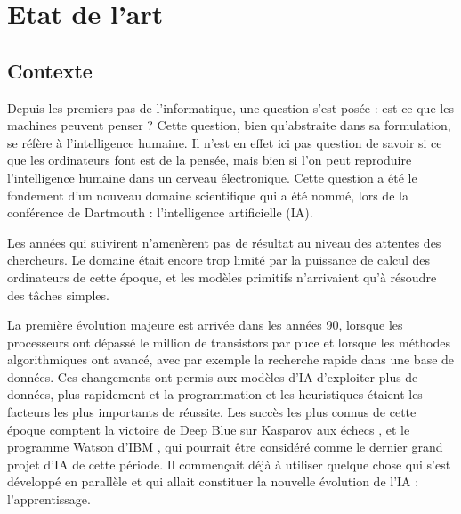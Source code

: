 \chapter{Etat de l'art}
	\minitoc
	\newpage






\section{Contexte}

	Depuis les premiers pas de l'informatique, une question s'est posée : est-ce que les machines peuvent penser ? \cite{turing1950computing} Cette question, bien qu'abstraite dans sa formulation, se réfère à l'intelligence humaine. Il n'est en effet ici pas question de savoir si ce que les ordinateurs font est de la pensée, mais bien si l'on peut reproduire l'intelligence humaine dans un cerveau électronique. Cette question a été le fondement d'un nouveau domaine scientifique qui a été nommé, lors de la conférence de Dartmouth \cite{mccarthy1955proposal} : l'intelligence artificielle (IA).

	Les années qui suivirent n'amenèrent pas de résultat au niveau des attentes des chercheurs. Le domaine était encore trop limité par la puissance de calcul des ordinateurs de cette époque, et les modèles primitifs n'arrivaient qu'à résoudre des tâches simples.

	La première évolution majeure est arrivée dans les années 90, lorsque les processeurs ont dépassé le million de transistors par puce et lorsque les méthodes algorithmiques ont avancé, avec par exemple la recherche rapide dans une base de données. Ces changements ont permis aux modèles d'IA d'exploiter plus de données, plus rapidement et la programmation et les heuristiques étaient les facteurs les plus importants de réussite. Les succès les plus connus de cette époque comptent la victoire de Deep Blue sur Kasparov aux échecs \cite{campbell2002deep}, et le programme Watson d'IBM \cite{ferrucci2012introduction}, qui pourrait être considéré comme le dernier grand projet d'IA de cette période. Il commençait déjà à utiliser quelque chose qui s'est développé en parallèle et qui allait constituer la nouvelle évolution de l'IA : l'apprentissage.

